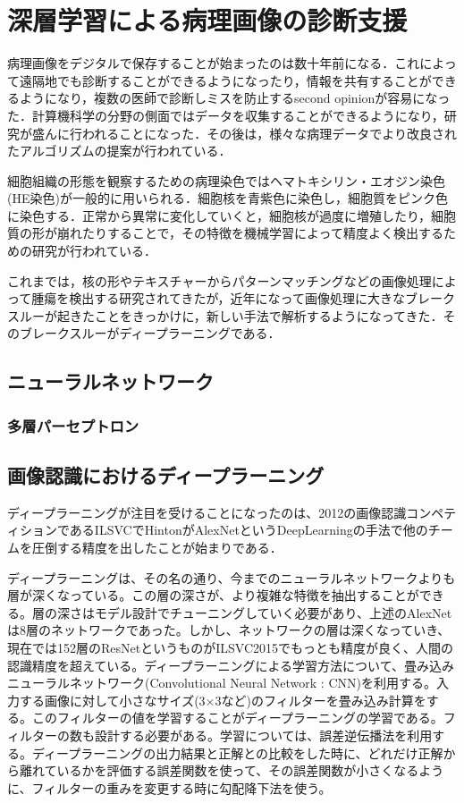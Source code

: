 \chapter{深層学習による病理画像の診断支援}
\label{chap_review}
病理画像をデジタルで保存することが始まったのは数十年前になる．これによって遠隔地でも診断することができるようになったり，情報を共有することができるようになり，複数の医師で診断しミスを防止するsecond opinionが容易になった．計算機科学の分野の側面ではデータを収集することができるようになり，研究が盛んに行われることになった．その後は，様々な病理データでより改良されたアルゴリズムの提案が行われている．

細胞組織の形態を観察するための病理染色ではヘマトキシリン・エオジン染色(HE染色)が一般的に用いられる．細胞核を青紫色に染色し，細胞質をピンク色に染色する．正常から異常に変化していくと，細胞核が過度に増殖したり，細胞質の形が崩れたりすることで，その特徴を機械学習によって精度よく検出するための研究が行われている．

これまでは，核の形やテキスチャーからパターンマッチングなどの画像処理によって腫瘍を検出する研究されてきたが，近年になって画像処理に大きなブレークスルーが起きたことをきっかけに，新しい手法で解析するようになってきた．そのブレークスルーがディープラーニングである．

\section{ニューラルネットワーク}
\subsection*{多層パーセプトロン}

\section{画像認識におけるディープラーニング}
ディープラーニングが注目を受けることになったのは、2012の画像認識コンペティションであるILSVCでHintonがAlexNetというDeepLearningの手法で他のチームを圧倒する精度を出したことが始まりである．

ディープラーニングは、その名の通り、今までのニューラルネットワークよりも層が深くなっている。この層の深さが、より複雑な特徴を抽出することができる。層の深さはモデル設計でチューニングしていく必要があり、上述のAlexNetは8層のネットワークであった。しかし、ネットワークの層は深くなっていき、現在では152層のResNetというものがILSVC2015でもっとも精度が良く、人間の認識精度を超えている。ディープラーニングによる学習方法について、畳み込みニューラルネットワーク(Convolutional Neural Network : CNN)を利用する。入力する画像に対して小さなサイズ(3×3など)のフィルターを畳み込み計算をする。このフィルターの値を学習することがディープラーニングの学習である。フィルターの数も設計する必要がある。学習については、誤差逆伝播法を利用する。ディープラーニングの出力結果と正解との比較をした時に、どれだけ正解から離れているかを評価する誤差関数を使って、その誤差関数が小さくなるように、フィルターの重みを変更する時に勾配降下法を使う。


